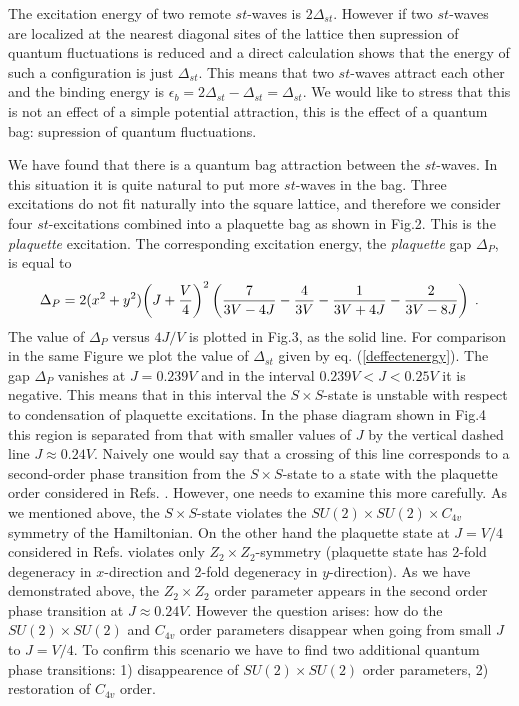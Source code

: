 The excitation energy of two remote $st$-waves is $2\Delta_{st}$.
However if two $st$-waves are localized at the nearest diagonal sites of 
the lattice then supression of quantum fluctuations is reduced and a direct
calculation shows that the energy of such a configuration is just
$\Delta_{st}$. This means that two $st$-waves attract each other and
the binding energy is $\epsilon_b=2\Delta_{st}-\Delta_{st}=\Delta_{st}$.
We would like to stress that this is not an effect of a simple potential
attraction, this is the effect of a quantum bag: supression of quantum
fluctuations.

We have found that there is a quantum bag attraction between the
$st$-waves. In this situation it is quite natural to put more $st$-waves
in the bag. Three excitations do not fit naturally into the square lattice,
and therefore we consider four $st$-excitations combined into a plaquette bag
as shown in Fig.2. This is the {\it plaquette} excitation. The corresponding 
excitation energy, the {\it plaquette} gap $\Delta_P$, is equal to
\begin{equation}
\label{plaquettetenergy}
\Delta_P =
2(x^2 +y^2)
{    \left(    J+{V\over 4}  \right)    }^2
\left(
{ 7\over {3V-4J}} - { 4 \over {3V}} - { 1 \over {3V+4J}} - { 2 \over {3V-8J}}
\right)\; .
\end{equation}
The value of $\Delta_P$ versus $4J/V$ is plotted in Fig.3, as the solid
line. For comparison in the same Figure we plot the value of $\Delta_{st}$
given by eq. (\ref{deffectenergy}).
The gap $\Delta_P$ vanishes at $J=0.239V$ and in the interval
$0.239V < J < 0.25V$ it is negative. This means that in this interval the
$S\times S$-state is unstable with respect to condensation of plaquette
excitations. In the phase diagram shown in Fig.4 this region is separated
from that with smaller values of $J$ by the vertical dashed line 
$J\approx 0.24V$.
Naively one would say that a crossing of this line corresponds to a
 second-order phase transition from the $S\times S$-state to
a state with the plaquette order considered in Refs.
 \cite{su4swave2,su4calc}.
However, one needs to examine this more carefully.
As we mentioned above, the $S\times S$-state  violates the
$SU(2)\times SU(2)\times C_{4v}$ symmetry of the Hamiltonian.
On the other hand the plaquette state at $J=V/4$ considered in
Refs. \cite{su4swave2,su4calc} violates
 only $Z_2\times Z_2$-symmetry 
(plaquette state has 2-fold degeneracy in $x$-direction and 2-fold
degeneracy in $y$-direction).
As we have demonstrated above, the $Z_2\times Z_2$ order parameter appears
in the second order phase transition at $J\approx 0.24V$. 
However the question arises: how do the $SU(2)\times SU(2)$
and $C_{4v}$ order parameters disappear when going from small $J$ to
$J=V/4$. To confirm this scenario \cite{su4swave2,su4calc}
we have to find two additional quantum phase transitions:
1) disappearence of $SU(2)\times SU(2)$ order parameters,
2) restoration of $C_{4v}$ order.

